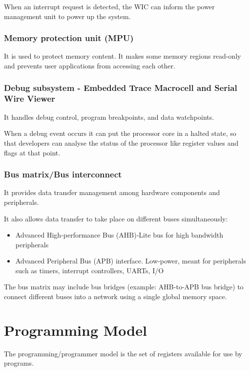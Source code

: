 When an interrupt request is detected, the WIC can inform the power management unit to power up the
system.

\subsubsection{Memory protection unit (MPU)}

It is used to protect memory content. It makes some memory regions read-only and prevents user
applications from accessing each other.


\subsubsection{Debug subsystem - Embedded Trace Macrocell and Serial Wire Viewer}

It handles debug control, program breakpoints, and data watchpoints.


When a debug event occurs it can put the processor core in a halted state, so that developers can
analyse the status of the processor like register values and flags at that point.

\subsubsection{Bus matrix/Bus interconnect}

It provides data transfer management among hardware components and peripherals.

It also allows data transfer to take place on different buses simultaneously:

\begin{itemize}
    \item Advanced High-performance Bus (AHB)-Lite bus for high bandwidth peripherals
    \item Advanced Peripheral Bus (APB) interface. Low-power, meant for peripherals such as timers, interrupt controllers, UARTs, I/O
\end{itemize}

The bus matrix may include bus bridges (example: AHB-to-APB bus bridge) to connect different buses
into a network using a single global memory space.


\section{Programming Model}

The programming/programmer model is the set of registers available for use by programs.

